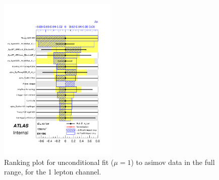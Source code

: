 \begin{figure}[ht]
      \centering
        \includegraphics[width=0.5\textwidth]{figures/Fit_np_rank/pulls_mu_Asimov/pulls_mu_SemileptonicVBS_5.pdf}
        \caption{Ranking plot for unconditional fit ($\mu=1$) to asimov data in the full range, for the 1 lepton channel.}
       \label{fig:fit_1lep_ranking_all}
\end{figure}



